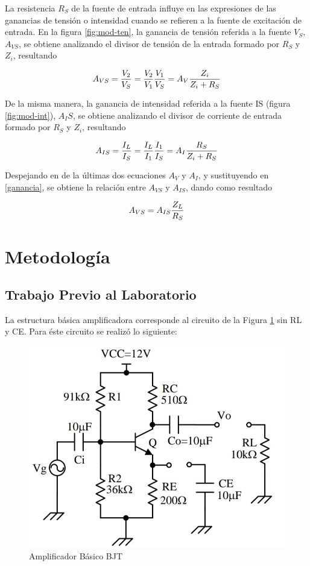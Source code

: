 \documentclass[12pt, a4paper]{article}
\begin{document}
    La resistencia $R_S$ de la fuente de entrada influye en las expresiones de las ganancias de tensión o intensidad cuando se refieren a la fuente de excitación de entrada. En la figura \ref{fig:mod-ten}, la ganancia de tensión referida a la fuente $V_S$, $A_{VS}$, se obtiene analizando el divisor de tensión de la entrada formado por $R_S$ y $Z_i$, resultando

    $$A_{VS} = {V_2 \over V_S} = {V_2 \over V_1}{V_1 \over V_S} = A_V \frac{Z_i}{Z_i + R_S}$$

    De la misma manera, la ganancia de intensidad referida a la fuente IS (figura \ref{fig:mod-int}), $A_IS$, se obtiene analizando el divisor de corriente de entrada formado por $R_S$ y $Z_i$, resultando

    $$A_{IS} = {I_L \over I_S} = {I_L \over I_1}{I_1 \over I_S} = A_I \frac{R_S}{Z_i + R_S}$$

    Despejando en de la últimas dos ecuaciones $A_V$ y $A_I$, y sustituyendo en \ref{ganancia}, se obtiene la relación entre $A_{VS}$ y $A_{IS}$, dando como resultado

    $$A_{VS} = A_{IS}{Z_L \over R_S}$$

    \newpage

    \section{Metodología}

    \subsection{Trabajo Previo al Laboratorio}

    La estructura básica amplificadora corresponde al circuito de la Figura \ref{fig:circuito} sin RL y CE. Para éste circuito se realizó lo siguiente:

    \begin{figure}[h!]
        \centering
        \includegraphics[height=5cm\textwidth]{amplificadorbjt.jpg}
        \caption{Amplificador Básico BJT}
        \label{fig:circuito}
    \end{figure}
\end{document}
